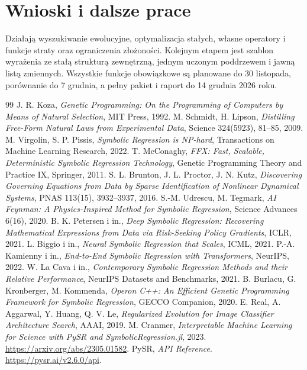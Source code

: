 \documentclass[11pt,a4paper]{article}
\begin{document}
\section{Wnioski i dalsze prace}
Działają wyszukiwanie ewolucyjne, optymalizacja stałych, własne operatory
i funkcje straty oraz ograniczenia złożoności. Kolejnym etapem jest szablon
wyrażenia ze stałą strukturą zewnętrzną, jednym uczonym poddrzewem i jawną
listą zmiennych. Wszystkie funkcje obowiązkowe są planowane do 30 listopada,
porównanie do 7 grudnia, a pełny pakiet i raport do 14 grudnia 2026 roku.

\begin{thebibliography}{99}
 J. R. Koza, \emph{Genetic Programming: On the Programming of
Computers by Means of Natural Selection}, MIT Press, 1992.
 M. Schmidt, H. Lipson, \emph{Distilling Free-Form Natural
Laws from Experimental Data}, Science 324(5923), 81--85, 2009.
 M. Virgolin, S. P. Pissis, \emph{Symbolic Regression is
NP-hard}, Transactions on Machine Learning Research, 2022.
 T. McConaghy, \emph{FFX: Fast, Scalable, Deterministic Symbolic
Regression Technology}, Genetic Programming Theory and Practice IX,
Springer, 2011.
 S. L. Brunton, J. L. Proctor, J. N. Kutz, \emph{Discovering
Governing Equations from Data by Sparse Identification of Nonlinear Dynamical
Systems}, PNAS 113(15), 3932--3937, 2016.
 S.-M. Udrescu, M. Tegmark, \emph{AI Feynman: A
Physics-Inspired Method for Symbolic Regression}, Science Advances 6(16), 2020.
 B. K. Petersen i in., \emph{Deep Symbolic Regression: Recovering
Mathematical Expressions from Data via Risk-Seeking Policy Gradients},
ICLR, 2021.
 L. Biggio i in., \emph{Neural Symbolic Regression that
Scales}, ICML, 2021.
 P.-A. Kamienny i in., \emph{End-to-End Symbolic Regression with
Transformers}, NeurIPS, 2022.
 W. La Cava i in., \emph{Contemporary Symbolic Regression
Methods and their Relative Performance}, NeurIPS Datasets and Benchmarks, 2021.
 B. Burlacu, G. Kronberger, M. Kommenda, \emph{Operon C++:
An Efficient Genetic Programming Framework for Symbolic Regression},
GECCO Companion, 2020.
 E. Real, A. Aggarwal, Y. Huang, Q. V. Le, \emph{Regularized
Evolution for Image Classifier Architecture Search}, AAAI, 2019.
 M. Cranmer, \emph{Interpretable Machine Learning for Science
with PySR and SymbolicRegression.jl}, 2023.
\url{https://arxiv.org/abs/2305.01582}.
 PySR, \emph{API Reference}.
\url{https://pysr.ai/v2.6.0/api}.
\end{thebibliography}
\end{document}
